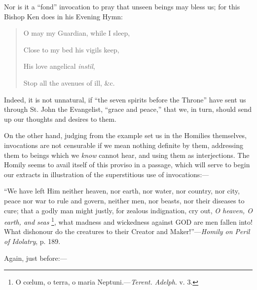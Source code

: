 Nor is it a ``fond'' invocation to pray that unseen beings
may bless us; for this Bishop Ken does in his Evening Hymn:

\begin{quote}

O may my Guardian, while I sleep,

Close to my bed his vigils keep,

His love angelical \emph{instil},

Stop all the avenues of ill, \&c.

\end{quote}

Indeed, it is not unnatural, if ``the seven spirits before the
Throne'' have sent us through St. John the Evangelist, ``grace
and peace,'' that we, in turn, should send up our thoughts and
desires to them.

On the other hand, judging from the example set us in the Homilies
themselves, invocations are not censurable if we mean nothing definite
by them, addressing them to beings which we \emph{know} cannot hear,
and using them as interjections. The Homily seems to avail itself of
this proviso in a passage, which will serve to begin our extracts in
illustration of the superstitious use of invocations:—

``We have left Him neither heaven, nor earth,
nor water, nor country, nor city, peace nor war to rule and
govern, neither men, nor beasts, nor their diseases to cure; that a
godly man might justly, for zealous indignation, cry out, \emph{O heaven,
O earth, and seas} \footnote{O cœlum, o terra, o maria Neptuni.—\emph{Terent.
Adelph}. v. 3.},
what madness and wickedness against GOD
are men fallen into! What dishonour do the creatures to their Creator
and Maker!''—\emph{Homily on Peril of Idolatry}, p. 189.

Again, just before:—

